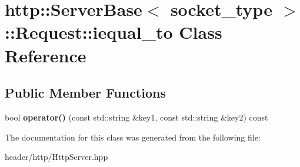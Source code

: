 \hypertarget{classhttp_1_1_server_base_1_1_request_1_1iequal__to}{}\section{http\+:\+:Server\+Base$<$ socket\+\_\+type $>$\+:\+:Request\+:\+:iequal\+\_\+to Class Reference}
\label{classhttp_1_1_server_base_1_1_request_1_1iequal__to}
\subsection*{Public Member Functions}
\begin{DoxyCompactItemize}
\item 
\mbox{\label{classhttp_1_1_server_base_1_1_request_1_1iequal__to_a3a25bdf33610fd67ae3e7f97532e4b01}} 
bool {\bfseries operator()} (const std\+::string \&key1, const std\+::string \&key2) const
\end{DoxyCompactItemize}


The documentation for this class was generated from the following file\+:\begin{DoxyCompactItemize}
\item 
header/http/Http\+Server.\+hpp\end{DoxyCompactItemize}

